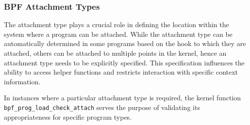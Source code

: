 \subsubsection{BPF Attachment Types}

The attachment type plays a crucial role in defining the location within the system where a program can be attached.
While the attachment type can be automatically determined in some programs based on the hook to which they are attached, others can be attached to multiple points in the kernel, hence an attachment type needs to be explicitly specified. This specification influences the ability to access helper functions and restricts interaction with specific context information.

In instances where a particular attachment type is required, the kernel function \texttt{bpf\_prog\_load\_check\_attach} serves the purpose of validating its appropriateness for specific program types.

